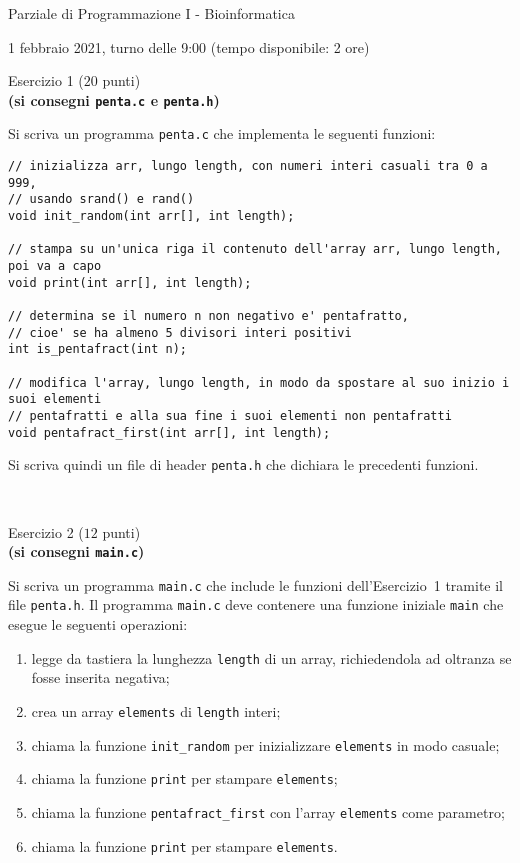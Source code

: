 \documentclass[12pt]{article}
\begin{document}
\begin{center}{\LARGE Parziale di Programmazione I - Bioinformatica}\\
\begin{center}
  \large 1 febbraio 2021, turno delle 9:00 (tempo disponibile: 2 ore)
\end{center}
\end{center}

\vspace*{1ex}
\begin{center}{\Large Esercizio 1} ($20$ punti)\\
  \textbf{(si consegni \texttt{penta.c} e \texttt{penta.h})}
\end{center}
Si scriva un programma \texttt{penta.c} che implementa le seguenti funzioni:
\begin{verbatim}
// inizializza arr, lungo length, con numeri interi casuali tra 0 a 999,
// usando srand() e rand()
void init_random(int arr[], int length);

// stampa su un'unica riga il contenuto dell'array arr, lungo length, poi va a capo
void print(int arr[], int length);

// determina se il numero n non negativo e' pentafratto,
// cioe' se ha almeno 5 divisori interi positivi
int is_pentafract(int n);

// modifica l'array, lungo length, in modo da spostare al suo inizio i suoi elementi
// pentafratti e alla sua fine i suoi elementi non pentafratti
void pentafract_first(int arr[], int length);
\end{verbatim}
%
Si scriva quindi un file di header \texttt{penta.h} che dichiara le precedenti funzioni.

\mbox{}\\
\begin{center}{\Large Esercizio 2} ($12$ punti)\\
  \textbf{(si consegni \texttt{main.c})}\end{center}
%
Si scriva un programma \texttt{main.c} che include le funzioni dell'Esercizio~1 tramite
il file \texttt{penta.h}.
Il programma \texttt{main.c} deve contenere una funzione iniziale \texttt{main} che esegue
le seguenti operazioni:
\begin{enumerate}
\item legge da tastiera la lunghezza \texttt{length} di un array, richiedendola ad oltranza se fosse inserita negativa;
\item crea un array \texttt{elements} di \texttt{length} interi;
\item chiama la funzione \texttt{init\_random} per inizializzare \texttt{elements} in modo casuale;
\item chiama la funzione \texttt{print} per stampare \texttt{elements};
\item chiama la funzione \texttt{pentafract\_first} con l'array \texttt{elements} come parametro;
\item chiama la funzione \texttt{print} per stampare \texttt{elements}.
\end{enumerate}
\end{document}
